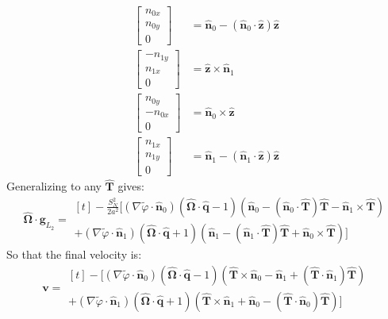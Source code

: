 \documentclass[reqno]{article}
\newcommand{\Omegahat}{\hat{\boldsymbol{\Omega}}}
\newcommand{\That}{\hat{\mathbf{T}}}
\newcommand{\zhat}{\hat{\mathbf{z}}}
\newcommand{\phitilde}{\tilde{\varphi}}
\newcommand{\n}{\mathbf{\hat{n}}}
\newcommand{\q}{\mathbf{\hat{q}}}
\begin{document}
\begin{equation}
    \begin{split}
        \begin{bmatrix}
            n_{0x} \\
            n_{0y} \\
            0
        \end{bmatrix}
        &=
        \n_0 - \left( \n_0 \cdot \zhat \right) \zhat  \\
        \begin{bmatrix}
            -n_{1y} \\
            n_{1x} \\
            0
        \end{bmatrix}
        &=
        \zhat \times \n_1 \\
        \begin{bmatrix}
            n_{0y} \\
            -n_{0x} \\
            0
        \end{bmatrix}
        &=
        \n_0 \times \zhat \\
        \begin{bmatrix}
            n_{1x} \\
            n_{1y} \\
            0
        \end{bmatrix}
        &=
        \n_1 - \left( \n_1 \cdot \zhat \right) \zhat
    \end{split}
\end{equation}
Generalizing to any $\That$ gives:
\begin{equation}
    \Omegahat \cdot \mathbf{g}_{L_2}
    =
    \begin{multlined}[t]
    -\frac{S_N^2}{2 a^2}\biggl[
        \left( \nabla \phitilde \cdot \n_0 \right)
        \left( \Omegahat \cdot \q - 1 \right)
        \left( 
            \n_0 - \left( \n_0 \cdot \That \right) \That - \n_1 \times \That
        \right) \\
        +
        \left( \nabla \phitilde \cdot \n_1 \right)
        \left( \Omegahat \cdot \q + 1 \right)
        \left(
            \n_1 - \left( \n_1 \cdot \That \right) \That + \n_0 \times \That
        \right)
    \biggr]
    \end{multlined}
\end{equation}
So that the final velocity is:
\begin{equation}
    \mathbf{v}
    =
    \begin{multlined}[t]
    -\biggl[
        \left( \nabla \phitilde \cdot \n_0 \right)
        \left( \Omegahat \cdot \q - 1 \right)
        \left( 
            \That \times \n_0 - \n_1 + \left( \That \cdot \n_1\right) \That
        \right) \\
        +
        \left( \nabla \phitilde \cdot \n_1 \right)
        \left( \Omegahat \cdot \q + 1 \right)
        \left(
            \That \times \n_1 + \n_0 - \left( \That \cdot \n_0 \right) \That
        \right)
    \biggr]
    \end{multlined}
\end{equation}
\end{document}
